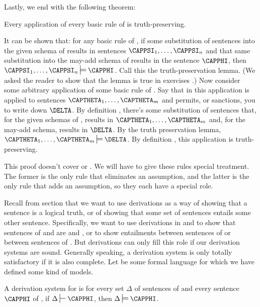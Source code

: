 Lastly, we end with the following theorem:
\begin{THEOREM}{}
	Every application of every basic rule of \GSD{} is truth-preserving.
\end{THEOREM}
\begin{PROOF}
	It can be shown that: for any basic rule  of \GSD{}, if some substitution of \GSL{} sentences into the given schema of  results in \GSL{} sentences $\CAPPSI_1,\ldots,\CAPPSI_{\integer{n}}$ and that same substitution into the may-add schema of  results in the \GSL{} sentence $\CAPPHI$, then $\CAPPSI_1,\ldots,\CAPPSI_{\integer{n}}\sdtstile{}{}\CAPPHI$.
	Call this the truth-preservation lemma.
	(We asked the reader to show that the lemma is true in exercises .)
	Now consider some arbitrary application of some basic rule  of \GSD{}. 
	Say that in this application  is applied to sentences $\CAPTHETA_1,\ldots,\CAPTHETA_{\integer{m}}$ and permits, or sanctions, you to write down $\DELTA$. 
	By definition , there's some substitution of \GSL{} sentences that, for the given schemas of , results in $\CAPTHETA_1,\ldots,\CAPTHETA_{\integer{m}}$ and, for the may-add schema, results in $\DELTA$. 
	By the truth preservation lemma, $\CAPTHETA_1,\ldots,\CAPTHETA_{\integer{m}}\sdtstile{}{}\DELTA$.
	By definition , this application is truth-preserving. 
	
	This proof doesn't cover  or .  We will have to give these rules special treatment.  The former is the only rule that eliminates an assumption, and the latter is the only rule that adds an assumption, so they each have a special role.
\end{PROOF}

Recall from section  that we want to use derivations as a way of showing that a sentence is a logical truth, or of showing that some set of sentences entails some other sentence.
Specifically, we want to use derivations in \GSD{} and \GQD{} to show that sentences of \GSL{} and \GQL{} are  and , or to show entailments between sentences of \GSL{} or between sentences of \GQL{}.  
But derivations can only fill this role if our derivation systems are sound.  Generally speaking, a derivation system is only totally satisfactory if it is also complete.
Let  be some formal language for which we have defined some kind of models.
\begin{majorILnc}{}
A derivation system  for  is  \Iff for every set $\Delta$ of sentences of  and every sentence $\CAPPHI$ of , if $\Delta\sststile{}{}\CAPPHI$, then $\Delta\sdtstile{}{}\CAPPHI$.
\end{majorILnc} 


